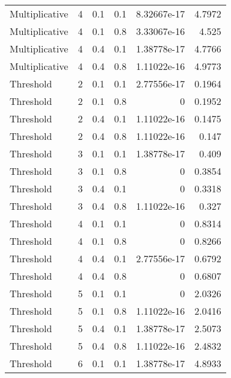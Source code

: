 \documentclass{article}
\begin{document}
\begin{figure}[H]
\begin{tabular}{lrrrrr}
 Multiplicative &       4 &   0.1 &            0.1 & 8.32667e-17 &            4.7972 \\
 Multiplicative &       4 &   0.1 &            0.8 & 3.33067e-16 &            4.525  \\
 Multiplicative &       4 &   0.4 &            0.1 & 1.38778e-17 &            4.7766 \\
 Multiplicative &       4 &   0.4 &            0.8 & 1.11022e-16 &            4.9773 \\
 Threshold      &       2 &   0.1 &            0.1 & 2.77556e-17 &            0.1964 \\
 Threshold      &       2 &   0.1 &            0.8 & 0           &            0.1952 \\
 Threshold      &       2 &   0.4 &            0.1 & 1.11022e-16 &            0.1475 \\
 Threshold      &       2 &   0.4 &            0.8 & 1.11022e-16 &            0.147  \\
 Threshold      &       3 &   0.1 &            0.1 & 1.38778e-17 &            0.409  \\
 Threshold      &       3 &   0.1 &            0.8 & 0           &            0.3854 \\
 Threshold      &       3 &   0.4 &            0.1 & 0           &            0.3318 \\
 Threshold      &       3 &   0.4 &            0.8 & 1.11022e-16 &            0.327  \\
 Threshold      &       4 &   0.1 &            0.1 & 0           &            0.8314 \\
 Threshold      &       4 &   0.1 &            0.8 & 0           &            0.8266 \\
 Threshold      &       4 &   0.4 &            0.1 & 2.77556e-17 &            0.6792 \\
 Threshold      &       4 &   0.4 &            0.8 & 0           &            0.6807 \\
 Threshold      &       5 &   0.1 &            0.1 & 0           &            2.0326 \\
 Threshold      &       5 &   0.1 &            0.8 & 1.11022e-16 &            2.0416 \\
 Threshold      &       5 &   0.4 &            0.1 & 1.38778e-17 &            2.5073 \\
 Threshold      &       5 &   0.4 &            0.8 & 1.11022e-16 &            2.4832 \\
 Threshold      &       6 &   0.1 &            0.1 & 1.38778e-17 &            4.8933 \\

\end{tabular}
\end{figure}
\end{document}

